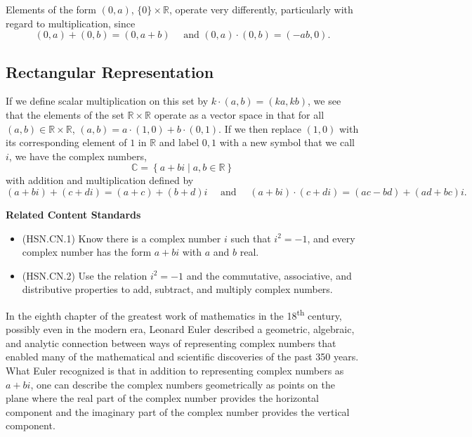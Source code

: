 \documentclass[
]{book}
\providecommand{\tightlist}{%
  \setlength{\itemsep}{0pt}\setlength{\parskip}{0pt}}
\newenvironment{standards}{}{}
\theoremstyle{definition}
\theoremstyle{definition}
\theoremstyle{definition}
\theoremstyle{definition}
\theoremstyle{remark}
\begin{document}
Elements of the form \((0,a)\), \(\{0\}\times \mathbb{R}\), operate very differently, particularly with regard to multiplication, since
\[(0,a)+(0,b)=(0,a+b) \quad \mbox{ and }  (0,a) \cdot (0,b) = (-ab,0).\]

\hypertarget{rectangular-representation}{%
\subsection{Rectangular Representation}\label{rectangular-representation}}

If we define scalar multiplication on this set by \(k \cdot (a,b) = (ka,kb)\), we see that the elements of the set \(\mathbb{R} \times \mathbb{R}\) operate as a vector space in that for all \((a,b) \in \mathbb{R}\times \mathbb{R}\), \((a,b) = a \cdot (1,0) + b \cdot (0,1)\). If we then replace \((1,0)\) with its corresponding element of \(1\) in \(\mathbb{R}\) and label \(0,1\) with a new symbol that we call \(i\), we have the complex numbers, \[\mathbb{C} = \left\{ a+bi\middle \vert a, b\in \mathbb{R}\right\}\] with addition and multiplication defined by
\[(a+bi) + (c+di) = (a+c) + (b+d)i \quad \mbox{ and } \quad (a+bi) \cdot (c+di) = (ac-bd) + (ad+bc)i.\]

\begin{standards}

\begin{center}
\textbf{Related Content Standards}

\end{center}

\begin{itemize}
\tightlist
\item
  (HSN.CN.1) Know there is a complex number \(i\) such that \(i^2 = -1\), and every complex number has the form \(a + bi\) with \(a\) and \(b\) real.
\item
  (HSN.CN.2) Use the relation \(i^2 = -1\) and the commutative, associative, and distributive properties to add, subtract, and multiply complex numbers.\\
\end{itemize}

\end{standards}

In the eighth chapter of the greatest work of mathematics in the 18\textsuperscript{th} century, possibly even in the modern era, Leonard Euler \citeyearpar{Euler} described a geometric, algebraic, and analytic connection between ways of representing complex numbers that enabled many of the mathematical and scientific discoveries of the past 350 years. What Euler recognized is that in addition to representing complex numbers as \(a+bi\), one can describe the complex numbers geometrically as points on the plane where the real part of the complex number provides the horizontal component and the imaginary part of the complex number provides the vertical component.
\end{document}
